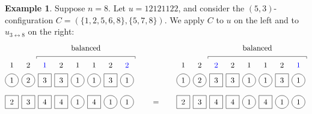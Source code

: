\documentclass[submission]{FPSAC2018}
\theoremstyle{plain}
\theoremstyle{definition}
\newtheorem{example}[thm]{Example}
\numberwithin{equation}{section}
\begin{document}
\begin{example}
Suppose $n = 8$.
Let $u = 12121122$, and consider the $(5,3)$-configuration $C = (\{1,2,5,6,8\}, \{5,7,8\})$.
We apply $C$ to $u$ on the left and to $u_{3 \leftrightarrow 8}$ on the right:
\[
\begin{tikzpicture}[baseline=-3]
  \def\sc{0.75}   %
  \def\lll{1.7}   %
  \def\ll{1}   %
  \def\l{0}   %
  \node[color=blue] at (3*\sc,\lll) {$1$};
  \node[color=blue] at (8*\sc,\lll) {$2$};
  \foreach \i in {1,5,6} { \node at (\i*\sc,\lll) {$1$}; }
  \foreach \i in {2,4,7} { \node at (\i*\sc,\lll) {$2$}; }
  \foreach \i in {1,2,5,6,8} { \draw (\i*\sc,\ll) circle (0.3); }
  \foreach \i in {3,4,7} { \draw (\i*\sc-.3,\ll-.3) rectangle +(0.6,+0.6); }
  \foreach \i in {1,5,6,8} { \node at (\i*\sc,\ll) {$1$}; }
  \foreach \i in {2} { \node at (\i*\sc,\ll) {$2$}; }
  \foreach \i in {3,4,7} { \node at (\i*\sc,\ll) {$3$}; }
  \foreach \i in {5,7,8} { \draw (\i*\sc,\l) circle (0.3); }
  \foreach \i in {1,2,3,4,6} { \draw (\i*\sc-.3,\l-.3) rectangle +(0.6,+0.6); }
  \foreach \i in {3,4,6} { \node at (\i*\sc,\l) {$4$}; }
  \foreach \i in {2} { \node at (\i*\sc,\l) {$3$}; }
  \foreach \i in {1} { \node at (\i*\sc,\l) {$2$}; }
  \foreach \i in {5,7,8} { \node at (\i*\sc,\l) {$1$}; }
  \draw (2.5*\sc,2) -- (2.5*\sc,2.1) -- (8.5*\sc,2.1) -- (8.5*\sc,2);
  \node at (5.5*\sc,2.5) {balanced};
\end{tikzpicture}
\hspace{20pt} = \hspace{20pt}
\begin{tikzpicture}[baseline=-3]
  \def\sc{0.75}   %
  \def\lll{1.7}   %
  \def\ll{1}   %
  \def\l{0}   %
  \node[color=blue] at (8*\sc,\lll) {$1$};
  \node[color=blue] at (3*\sc,\lll) {$2$};
  \foreach \i in {1,5,6} { \node at (\i*\sc,\lll) {$1$}; }
  \foreach \i in {2,4,7} { \node at (\i*\sc,\lll) {$2$}; }
  \foreach \i in {1,2,5,6,8} { \draw (\i*\sc,\ll) circle (0.3); }
  \foreach \i in {3,4,7} { \draw (\i*\sc-.3,\ll-.3) rectangle +(0.6,+0.6); }
  \foreach \i in {1,5,6,8} { \node at (\i*\sc,\ll) {$1$}; }
  \foreach \i in {3,4,7} { \node at (\i*\sc,\ll) {$3$}; }
  \foreach \i in {2} { \node at (\i*\sc,\ll) {$2$}; }
  \foreach \i in {5,7,8} { \draw (\i*\sc,\l) circle (0.3); }
  \foreach \i in {1,2,3,4,6} { \draw (\i*\sc-.3,\l-.3) rectangle +(0.6,+0.6); }
  \foreach \i in {3,4,6} { \node at (\i*\sc,\l) {$4$}; }
  \foreach \i in {2} { \node at (\i*\sc,\l) {$3$}; }
  \foreach \i in {1} { \node at (\i*\sc,\l) {$2$}; }
  \foreach \i in {5,7,8} { \node at (\i*\sc,\l) {$1$}; }
  \draw (2.5*\sc,2) -- (2.5*\sc,2.1) -- (8.5*\sc,2.1) -- (8.5*\sc,2);
  \node at (5.5*\sc,2.5) {balanced};
\end{tikzpicture}
\]
\end{example}
\end{document}
